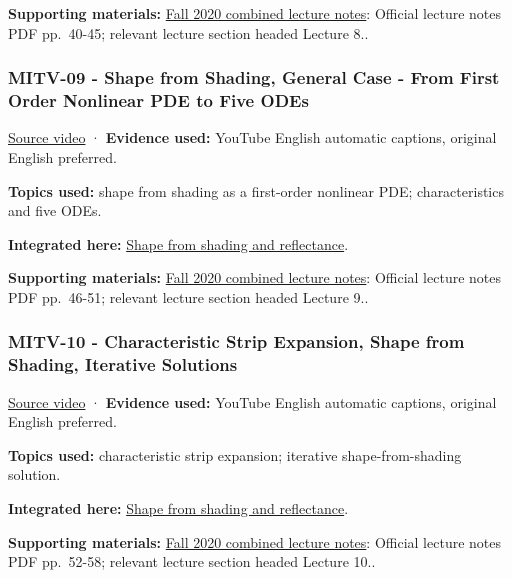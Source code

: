 \textbf{Supporting materials:} \href{https://ocw.mit.edu/courses/6-801-machine-vision-fall-2020/9ec44f69e72995c370b3797818ba01e6_MIT6_801F20_lectureNotes.pdf}{Fall 2020 combined lecture notes}: Official lecture notes PDF pp.~40-45; relevant lecture section headed Lecture 8..

\subsubsection{MITV-09 - Shape from Shading, General Case - From First Order Nonlinear PDE to Five ODEs}\label{04-visual-computing-ii-ch036-mitv-09---shape-from-shading-general-case---from-first-order-nonlinear-pde-to-five-odes}

\href{https://www.youtube.com/watch?v=J4gbaRyWpoM}{Source video} · \textbf{Evidence used:} YouTube English automatic captions, original English preferred.

\textbf{Topics used:} shape from shading as a first-order nonlinear PDE; characteristics and five ODEs.

\textbf{Integrated here:} \hyperref[04-visual-computing-ii-ch032-shape-from-shading-and-reflectance]{Shape from shading and reflectance}.

\textbf{Supporting materials:} \href{https://ocw.mit.edu/courses/6-801-machine-vision-fall-2020/9ec44f69e72995c370b3797818ba01e6_MIT6_801F20_lectureNotes.pdf}{Fall 2020 combined lecture notes}: Official lecture notes PDF pp.~46-51; relevant lecture section headed Lecture 9..

\subsubsection{MITV-10 - Characteristic Strip Expansion, Shape from Shading, Iterative Solutions}\label{04-visual-computing-ii-ch036-mitv-10---characteristic-strip-expansion-shape-from-shading-iterative-solutions}

\href{https://www.youtube.com/watch?v=XSUjp-cDyeY}{Source video} · \textbf{Evidence used:} YouTube English automatic captions, original English preferred.

\textbf{Topics used:} characteristic strip expansion; iterative shape-from-shading solution.

\textbf{Integrated here:} \hyperref[04-visual-computing-ii-ch032-shape-from-shading-and-reflectance]{Shape from shading and reflectance}.

\textbf{Supporting materials:} \href{https://ocw.mit.edu/courses/6-801-machine-vision-fall-2020/9ec44f69e72995c370b3797818ba01e6_MIT6_801F20_lectureNotes.pdf}{Fall 2020 combined lecture notes}: Official lecture notes PDF pp.~52-58; relevant lecture section headed Lecture 10..

